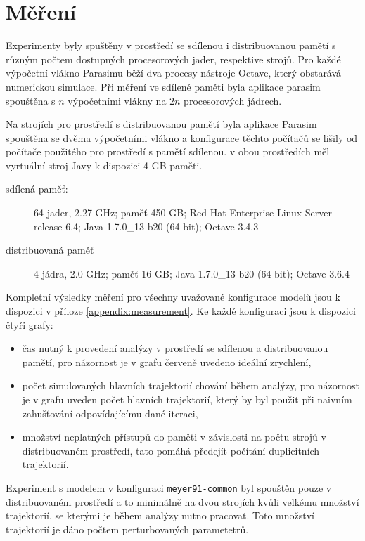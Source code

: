 \section{Měření}\label{section:measurement}

Experimenty byly spuštěny v prostředí se sdílenou i distribuovanou pamětí s různým
počtem dostupných procesorových jader, respektive strojů. Pro každé výpočetní vlákno
Parasimu běží dva procesy nástroje Octave, který obstarává numerickou simulace. Při měření
ve sdílené paměti byla aplikace parasim spouštěna s $n$ výpočetními vlákny na $2n$
procesorových jádrech.

Na strojích pro prostředí s distribuovanou pamětí byla aplikace Parasim spouštěna se dvěma
výpočetními vlákno a konfigurace těchto počítačů se lišily od počítače použitého pro prostředí
s pamětí sdílenou. v obou prostředích měl vyrtuální stroj Javy k dispozici 4 GB paměti.

\begin{description}
	\item[sdílená paměť: ]
		 64 jader, 2.27 GHz; paměť 450 GB; Red Hat Enterprise Linux Server release 6.4; Java 1.7.0\_13-b20 (64 bit); Octave 3.4.3
	\item[distribuovaná paměť]
		4 jádra, 2.0 GHz; paměť 16 GB; Java 1.7.0\_13-b20 (64 bit); Octave 3.6.4
\end{description}

Kompletní výsledky měření pro všechny uvažované konfigurace modelů jsou k dispozici
v příloze \ref{appendix:measurement}. Ke každé konfiguraci jsou k dispozici čtyři grafy:

\begin{itemize}
	\item	čas nutný k provedení analýzy v prostředí se sdílenou a distribuovanou pamětí,
			pro názornost je v grafu červeně uvedeno ideální zrychlení,
	\item	počet simulovaných hlavních trajektorií chování během analýzy, pro názornost je v grafu
			uveden počet hlavních trajektorií, který by byl použit při naivním zahušťování odpovídajícímu
			dané iteraci,
	\item	množství neplatných přístupů do paměti v závislosti na počtu strojů v distribuovaném prostředí,
			tato pomáhá předejít po\-čí\-tá\-ní duplicitních trajektorií.
\end{itemize}

Experiment s modelem v konfiguraci \texttt{meyer91-common} byl spouštěn pouze v distribuovaném prostředí
a to minimálně na dvou strojích kvůli velkému množství trajektorií, se kterými je během analýzy nutno
pracovat. Toto množství trajektorií je dáno počtem perturbovaných parametetrů.


